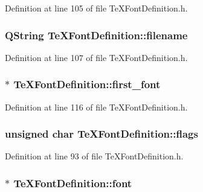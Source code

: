 Definition at line 105 of file Te\+X\+Font\+Definition.\+h.

\hypertarget{classTeXFontDefinition_a28d5b98d97711686c6bc0e8df3bc9cc6}{
\subsubsection[{filename}]{\setlength{\rightskip}{0pt plus 5cm}Q\+String Te\+X\+Font\+Definition\+::filename}}\label{classTeXFontDefinition_a28d5b98d97711686c6bc0e8df3bc9cc6}


Definition at line 107 of file Te\+X\+Font\+Definition.\+h.

\hypertarget{classTeXFontDefinition_ab6e60134247487e543a17590bf5ed774}{
\subsubsection[{first\+\_\+font}]{$\ast$ Te\+X\+Font\+Definition\+::first\+\_\+font}}\label{classTeXFontDefinition_ab6e60134247487e543a17590bf5ed774}


Definition at line 116 of file Te\+X\+Font\+Definition.\+h.

\hypertarget{classTeXFontDefinition_ad381057cceb9b78816df47e27c771d1e}{
\subsubsection[{flags}]{\setlength{\rightskip}{0pt plus 5cm}unsigned char Te\+X\+Font\+Definition\+::flags}}\label{classTeXFontDefinition_ad381057cceb9b78816df47e27c771d1e}


Definition at line 93 of file Te\+X\+Font\+Definition.\+h.

\hypertarget{classTeXFontDefinition_a3e788e09d8978795672226b472163b4f}{
\subsubsection[{font}]{$\ast$ Te\+X\+Font\+Definition\+::font}}\label{classTeXFontDefinition_a3e788e09d8978795672226b472163b4f}


